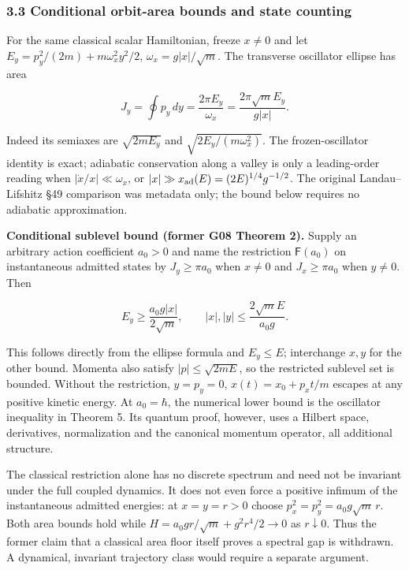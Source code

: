 \documentclass[11pt,a4paper]{article}
\begin{document}
\hypertarget{conditional-orbit-area-bounds-and-state-counting}{%
\subsubsection{3.3 Conditional orbit-area bounds and state
counting}\label{conditional-orbit-area-bounds-and-state-counting}}

For the same classical scalar Hamiltonian, freeze \(x\ne0\) and let
\(E_y=p_y^2/(2m)+m\omega_x^2y^2/2\), \(\omega_x=g|x|/\sqrt m\). The
transverse oscillator ellipse has area

\[J_y=\oint p_y\,dy=\frac{2\pi E_y}{\omega_x}
 =\frac{2\pi\sqrt m E_y}{g|x|}.\]

Indeed its semiaxes are \(\sqrt{2mE_y}\) and
\(\sqrt{2E_y/(m\omega_x^2)}\). The frozen-oscillator identity is exact;
adiabatic conservation along a valley is only a leading-order reading
when \(|\dot x/x|\ll\omega_x\), or
\(|x|\gg x_{\rm ad}(E)=(2E)^{1/4}g^{-1/2}\). The original
Landau--Lifshitz §49 comparison was metadata only; the bound below
requires no adiabatic approximation.

\textbf{Conditional sublevel bound (former G08 Theorem 2).} Supply an
arbitrary action coefficient \(a_0>0\) and name the restriction
\(\mathsf F(a_0)\) on instantaneous admitted states by \(J_y\ge\pi a_0\)
when \(x\ne0\) and \(J_x\ge\pi a_0\) when \(y\ne0\). Then

\[E_y\ge\frac{a_0g|x|}{2\sqrt m},\qquad
 |x|,|y|\le\frac{2\sqrt m E}{a_0g}.\]

This follows directly from the ellipse formula and \(E_y\le E\);
interchange \(x,y\) for the other bound. Momenta also satisfy
\(|p|\le\sqrt{2mE}\), so the restricted sublevel set is bounded. Without
the restriction, \(y=p_y=0\), \(x(t)=x_0+p_xt/m\) escapes at any
positive kinetic energy. At \(a_0=\hbar\), the numerical lower bound is
the oscillator inequality in Theorem 5. Its quantum proof, however, uses
a Hilbert space, derivatives, normalization and the canonical momentum
operator, all additional structure.

The classical restriction alone has no discrete spectrum and need not be
invariant under the full coupled dynamics. It does not even force a
positive infimum of the instantaneous admitted energies: at \(x=y=r>0\)
choose \(p_x^2=p_y^2=a_0g\sqrt m\,r\). Both area bounds hold while
\(H=a_0gr/\sqrt m+g^2r^4/2\to0\) as \(r\downarrow0\). Thus the former
claim that a classical area floor itself proves a spectral gap is
withdrawn. A dynamical, invariant trajectory class would require a
separate argument.
\end{document}
